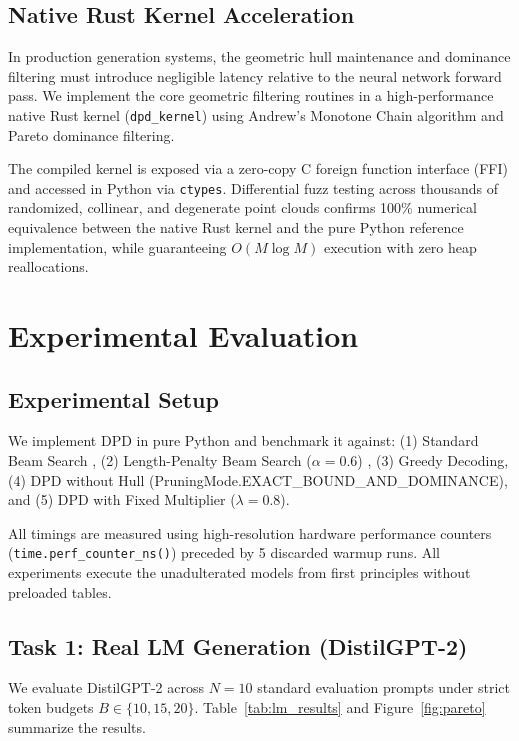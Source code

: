 \documentclass[11pt,a4paper]{article}
\theoremstyle{plain}
\theoremstyle{definition}
\theoremstyle{remark}
\begin{document}
\subsection{Native Rust Kernel Acceleration}
In production generation systems, the geometric hull maintenance and dominance filtering must introduce negligible latency relative to the neural network forward pass. We implement the core geometric filtering routines in a high-performance native Rust kernel (\texttt{dpd\_kernel}) using Andrew's Monotone Chain algorithm \citep{andrew1979another} and Pareto dominance filtering. 

The compiled kernel is exposed via a zero-copy C foreign function interface (FFI) and accessed in Python via \texttt{ctypes}. Differential fuzz testing across thousands of randomized, collinear, and degenerate point clouds confirms 100\% numerical equivalence between the native Rust kernel and the pure Python reference implementation, while guaranteeing $O(M \log M)$ execution with zero heap reallocations.

\section{Experimental Evaluation}

\subsection{Experimental Setup}
We implement DPD in pure Python and benchmark it against:
(1) Standard Beam Search \citep{wu2016google}, (2) Length-Penalty Beam Search ($\alpha=0.6$) \citep{wu2016google}, (3) Greedy Decoding, (4) DPD without Hull (PruningMode.EXACT\_BOUND\_AND\_DOMINANCE), and (5) DPD with Fixed Multiplier ($\lambda=0.8$).

All timings are measured using high-resolution hardware performance counters (\texttt{time.perf\_counter\_ns()}) preceded by 5 discarded warmup runs. All experiments execute the unadulterated models from first principles without preloaded tables.

\subsection{Task 1: Real LM Generation (DistilGPT-2)}
We evaluate DistilGPT-2 across $N=10$ standard evaluation prompts under strict token budgets $B \in \{10, 15, 20\}$. 
Table~\ref{tab:lm_results} and Figure~\ref{fig:pareto} summarize the results.


\end{document}
